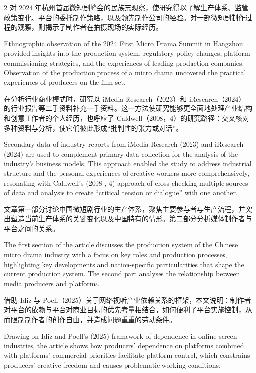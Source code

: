 \documentclass[10pt,a4paper]{article}
\begin{document}
\begin{paracol}{2}
\switchcolumn*
对 2024 年杭州首届微短剧峰会的民族志观察，使研究得以了解生产体系、监管政策变化、平台的委托制作策略，以及领先制作公司的经验。对一部微短剧制作过程的观察，则揭示了制作者在拍摄现场的实际经历。\par
\switchcolumn
Ethnographic observation of the 2024 First Micro Drama Summit in Hangzhou provided insights into the production system, regulatory policy changes, platform commissioning strategies, and the experiences of leading production companies. Observation of the production process of a micro drama uncovered the practical experiences of producers on the film set.\par
\switchcolumn*
在分析行业商业模式时，研究以 iMedia Research（2023）和 iResearch（2024）的行业报告等二手资料补充一手资料。这一方法使研究能够更全面地处理产业结构和创意工作者的个人经历，也呼应了 Caldwell（2008，4）的研究路径：交叉核对多种资料与分析，使它们彼此形成“批判性的张力或对话”。\par
\switchcolumn
Secondary data of industry reports from iMedia Research (2023) and iResearch (2024) are used to complement primary data collection for the analysis of the industry’s business models. This approach enabled the study to address industrial structure and the personal experiences of creative workers more comprehensively, resonating with Caldwell’s (2008 , 4) approach of cross-checking multiple sources of data and analysis to create “critical tension or dialogue” with one another.\par
\switchcolumn*
文章第一部分讨论中国微短剧行业的生产体系，聚焦主要参与者与生产流程，并突出塑造当前生产体系的关键变化以及中国特有的情形。第二部分分析媒体制作者与平台之间的关系。\par
\switchcolumn
The first section of the article discusses the production system of the Chinese micro drama industry with a focus on key roles and production processes, highlighting key developments and nation-specific particularities that shape the current production system. The second part analyses the relationship between media producers and platforms.\par
\switchcolumn*
借助 Idiz 与 Poell（2025）关于网络视听产业依赖关系的框架，本文说明：制作者对平台的依赖与平台对商业目标的优先考量相结合，如何便利了平台实施控制，从而限制制作者的创作自由，并造成问题重重的劳动条件。\par
\switchcolumn
Drawing on Idiz and Poell’s (2025) framework of dependence in online screen industries, the article shows how producers’ dependence on platforms combined with platforms’ commercial priorities facilitate platform control, which constrains producers’ creative freedom and causes problematic working conditions.\par
\switchcolumn*
\end{paracol}
\end{document}
